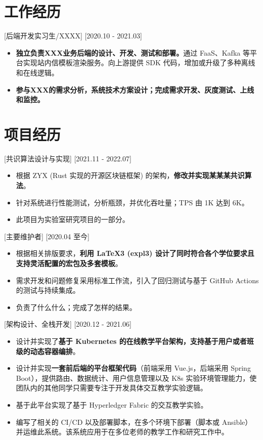 \documentclass{resume}
\begin{document}
\section{工作经历}

[后端开发实习生/XXXX]
[2020.10 - 2021.03] 

\begin{itemize}
  \item \textbf{独立负责XXX业务后端的设计、开发、测试和部署。}通过 FaaS、Kafka 等平台实现站内信模板渲染服务。向上游提供 SDK 代码，增加或升级了多种离线和在线逻辑。
  \item \textbf{参与XXX的需求分析，系统技术方案设计；完成需求开发、灰度测试、上线和监控。}
\end{itemize}

\section{项目经历}

[共识算法设计与实现]
[2021.11 - 2022.07] 

\begin{itemize}
  \item 根据 ZYX (Rust 实现的开源区块链框架) 的架构，\textbf{修改并实现某某某共识算法}。
  \item 针对系统进行性能测试，分析瓶颈，并优化吞吐量；TPS 由 1K 达到 6K。
  \item 此项目为实验室研究项目的一部分。
\end{itemize}

[主要维护者]
[2020.04 至今]

\begin{itemize}
  \item 根据相关排版要求，\textbf{利用 LaTeX3 (expl3) 设计了同时符合各个学位要求且支持灵活配置的宏包及多套模板}。
  \item 需求开发和问题修复采用标准工作流，引入了回归测试与基于 GitHub Actions 的测试与持续集成。
  \item 负责了什么什么；完成了怎样的结果。
\end{itemize}


[架构设计、全栈开发]
[2020.12 - 2021.06] 

\begin{itemize}
  \item 设计并实现了\textbf{基于 Kubernetes 的在线教学平台架构，支持基于用户或者班级的动态容器编排}。
  \item 设计并实现\textbf{一套前后端的平台框架代码}（前端采用 Vue.js，后端采用 Spring Boot），提供路由、数据统计、用户信息管理以及 K8s 实验环境管理能力，使团队内的其他同学只需要专注于开发具体交互教学实验逻辑。
  \item 基于此平台实现了基于 Hyperledger Fabric 的交互教学实验。
  \item 编写了相关的 CI/CD 以及部署脚本，在多个环境下部署（脚本或 Ansible）并运维此系统。该系统应用于在多位老师的教学工作和研究工作中。
\end{itemize}
\end{document}
